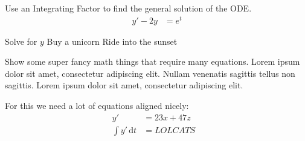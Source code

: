 \documentclass[11pt]{report}
\begin{document}
\date{Tuesday, January 31, 2012}

\begin{solutionset} %

\begin{problem} %
	Use an Integrating Factor to find the general solution of the ODE.
	\begin{align*}
	y' -2y &= e^t
	\end{align*}
\end{problem}

\begin{stepsolution} %
	\step
	Solve for $y$
	\step
	Buy a unicorn
	\step
	Ride into the sunset
\end{stepsolution}

\begin{problem}
	Show some super fancy math things that require many equations. Lorem ipsum dolor sit amet, consectetur adipiscing elit. Nullam venenatis sagittis tellus non sagittis. Lorem ipsum dolor sit amet, consectetur adipiscing elit. 
\end{problem}

\begin{solution} %
	For this we need a lot of equations aligned nicely:\\
	\begin{align*}
	y\prime &= 23x + 47z &\\
	\int y\prime \, \mathrm{d}t &= LOLCATS &\\
	\end{align*}
\end{solution}

\end{solutionset}
\end{document}
